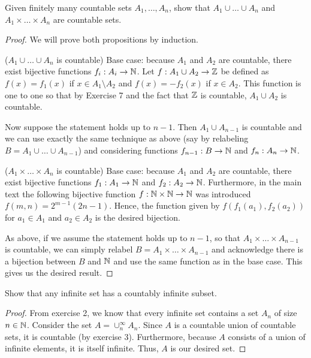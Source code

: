 \begin{exercise}{3}
Given finitely many countable sets $A_1,\dots,A_n$, show that $A_1\cup\dots\cup A_n$ and $A_1\times\dots\times A_n$ are countable sets.
\end{exercise}
\begin{proof}
We will prove both propositions by induction.

($A_1\cup\dots\cup A_n$ is countable) Base case: because $A_1$ and $A_2$ are countable, there exist bijective functions $f_i:A_i\to\mathbb{N}$. Let $f:A_1\cup A_2\to\mathbb{Z}$ be defined as $f(x)=f_1(x)$ if $x\in A_1\setminus A_2$ and $f(x)=-f_2(x)$ if $x\in A_2$. This function is one to one so that by Exercise 7 and the fact that $\mathbb{Z}$ is countable, $A_1\cup A_2$ is countable. 

Now suppose the statement holds up to $n-1$. Then $A_1\cup A_{n-1}$ is countable and we can use exactly the same technique as above (say by relabeling $B=A_1\cup\dots\cup A_{n-1}$) and considering functions $f_{n-1}:B\to\mathbb{N}$ and $f_n:A_n\to\mathbb{N}$.

($A_1\times\dots\times A_n$ is countable) Base case: because $A_1$ and $A_2$ are countable, there exist bijective functions $f_1:A_1\to\mathbb{N}$ and $f_2:A_2\to\mathbb{N}$. Furthermore, in the main text the following bijective function $f:\mathbb{N}\times\mathbb{N}\to\mathbb{N}$ was introduced $f(m,n)=2^{m-1}(2n-1)$. Hence, the function given by $f(f_1(a_1),f_2(a_2))$ for $a_1\in A_1$ and $a_2\in A_2$ is the desired bijection. 

As above, if we assume the statement holds up to $n-1$, so that $A_1\times\dots\times A_{n-1}$ is countable, we can simply relabel $B=A_1\times\dots\times A_{n-1}$ and acknowledge there is a bijection between $B$ and $\mathbb{N}$ and use the same function as in the base case. This gives us the desired result.
\end{proof} 

\begin{exercise}{4}
Show that any infinite set has a countably infinite subset.
\end{exercise}
\begin{proof}
From exercise 2, we know that every infinite set contains a set $A_n$ of size $n\in\mathbb{N}$. Consider the set $A=\cup_n^{\infty} A_n$. Since $A$ is a countable union of countable sets, it is countable (by exercise 3). Furthermore, because $A$ consists of a union of infinite elements, it is itself infinite. Thus, $A$ is our desired set.
\end{proof} 

